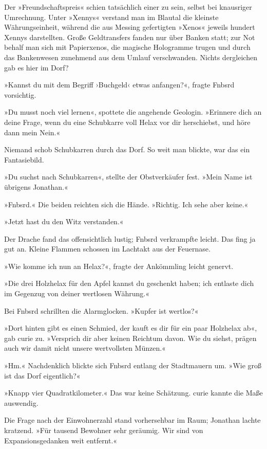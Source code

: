 Der »Freundschaftspreis« schien tatsächlich einer zu sein, selbst bei knausriger Umrechnung. Unter »Xennys« verstand man im Blautal die kleinste Währungseinheit, während die aus Messing gefertigten »Xenos« jeweils hundert Xennys darstellten. Große Geldtransfers fanden nur über Banken statt; zur Not behalf man sich mit Papierxenos, die magische Hologramme trugen und durch das Bankenwesen zunehmend aus dem Umlauf verschwanden. Nichts dergleichen gab es hier im Dorf?

»Kannst du mit dem Begriff ›Buchgeld‹ etwas anfangen?«, fragte Fnbsrd vorsichtig.

»Du musst noch viel lernen«, spottete die angehende Geologin. »Erinnere dich an deine Frage, wenn du eine Schubkarre voll Helax vor dir herschiebst, und höre dann mein Nein.«

Niemand schob Schubkarren durch das Dorf. So weit man blickte, war das ein Fantasiebild.

»Du suchst nach Schubkarren«, stellte der Obstverkäufer fest. »Mein Name ist übrigens Jonathan.«

»Fnbsrd.« Die beiden reichten sich die Hände. »Richtig. Ich sehe aber keine.«

»Jetzt hast du den Witz verstanden.«

Der Drache fand das offensichtlich lustig; Fnbsrd verkrampfte leicht. Das fing ja gut an. Kleine Flammen schossen im Lachtakt aus der Feuernase.

»Wie komme ich nun an Helax?«, fragte der Ankömmling leicht genervt.

»Die drei Holzhelax für den Apfel kannst du geschenkt haben; ich entlaste dich im Gegenzug von deiner wertlosen Währung.«

Bei Fnbsrd schrillten die Alarmglocken. »Kupfer ist wertlos?«

»Dort hinten gibt es einen Schmied, der kauft es dir für ein paar Holzhelax ab«, gab curie zu. »Versprich dir aber keinen Reichtum davon. Wie du siehst, prägen auch wir damit nicht unsere wertvollsten Münzen.«

»Hm.« Nachdenklich blickte sich Fnbsrd entlang der Stadtmauern um. »Wie groß ist das Dorf eigentlich?«

»Knapp vier Quadratkilometer.« Das war keine Schätzung. curie kannte die Maße auswendig. %

Die Frage nach der Einwohnerzahl stand vorhersehbar im Raum; Jonathan lachte kratzend. »Für tausend Bewohner sehr geräumig. Wir sind von Expansionsgedanken weit entfernt.«

